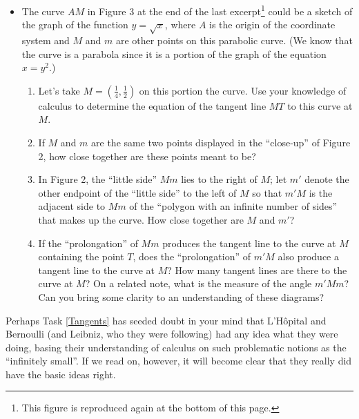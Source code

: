 \message{ !name(LHopitalsRule_2021.03.29.tex)}\documentclass[11pt]{article}
\newcounter{tasknumb}
\newcommand{\tasknumb}[1]{\refstepcounter{tasknumb}\textmd{\textbf{$\fbox{$\fbox{Task \thetasknumb}$}$}}#1}
\newenvironment{task}[1][]%
 {\begin{itemize}
 \item[\tasknumb{#1}] }
{
    \end{itemize}    }%
\begin{document}
\newpage
\begin{task}[\label{Tangents}]
The curve $AM$ in Figure 3 at the end of the last excerpt\footnote{This figure is reproduced again at the bottom of this page.} could be a sketch of the graph of the function $y=\sqrt{x}$, where $A$ is the origin of the coordinate system and $M$ and $m$ are other points on this parabolic curve. (We know that the curve is a parabola since it is a portion of the graph of the equation $x=y^2$.)
\begin{enumerate}
\item[(a)] Let's take $M=(\frac14, \frac12)$ on this portion the curve. Use your knowledge of calculus to determine the equation of the tangent line $MT$ to this curve at $M$. \\
\item[(b)] If $M$ and $m$ are the same two points displayed in the ``close-up'' of Figure 2, how close together are these points meant to be? \\
\item[(c)] In Figure 2, the ``little side'' $Mm$ lies to the right of $M$; let $m'$ denote the other endpoint of the ``little side'' to the left of $M$ so that $m'M$ is the adjacent side to $Mm$ of the ``polygon with an infinite number of sides'' that makes up the curve. How close together are $M$ and $m'$? \\
\item[(d)] If the ``prolongation'' of $Mm$ produces the tangent line to the curve at $M$ containing the point $T$, does the ``prolongation'' of $m'M$ also produce a tangent line to the curve at $M$? How many tangent lines are there to the curve at $M$? On a related note, what is the measure of the angle $m'Mm$? Can you bring some clarity to an understanding of these diagrams?
\end{enumerate}
\end{task}


Perhaps Task \ref{Tangents} %
has seeded doubt in your mind that L'H\^opital and Bernoulli (and Leibniz, who they were following) had any idea what they were doing, basing their understanding of calculus on such problematic notions as the ``infinitely small''. If we read on, however, it will become clear that they really did have the basic ideas right.

\bigskip
\end{document}
